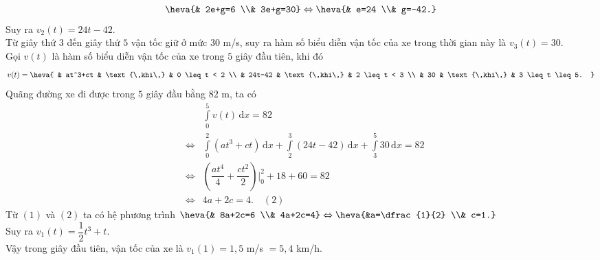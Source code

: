\begin{bt}
{	$$ \heva{& 2e+g=6 \\& 3e+g=30} \Leftrightarrow \heva{& e=24 \\& g=-42.} $$
	Suy ra $v_{2}(t)=24t-42$.\\
	Từ giây thứ $3$ đến giây thứ $5$ vận tốc giữ ở mức $30$ m/s, suy ra hàm số biểu diễn vận tốc của xe trong thời gian này là $v_{3}(t)=30$.\\
	Gọi $v(t)$ là hàm số biểu diễn vận tốc của xe trong $5$ giây đầu tiên, khi đó
	$$ v(t)=\heva{
	& at^3+ct & \text{\,khi\,} & 0 \leq t < 2 \\
	& 24t-42 & \text{\,khi\,} & 2 \leq t < 3 \\
	& 30 & \text{\,khi\,} & 3 \leq t \leq 5.
	} $$
	Quãng đường xe đi được trong $5$ giây đầu bằng $82$ m, ta có
	\begin{eqnarray*}
		&& \displaystyle\int\limits_0^5 v(t) \mathrm{\,d}x= 82 \\
		&\Leftrightarrow& \displaystyle\int\limits_0^2 (at^3+ct) \mathrm{\,d}x + \displaystyle\int\limits_2^3 (24t-42) \mathrm{\,d}x + \displaystyle\int\limits_3^5 30 \mathrm{\,d}x = 82 \\
		&\Leftrightarrow& \left(\dfrac{at^4}{4}+\dfrac{ct^2}{2}\right)\Bigg|_0^2 + 18 + 60 = 82 \\
		&\Leftrightarrow& 4a+2c=4. \quad(2)
	\end{eqnarray*}
	Từ $(1)$ và $(2)$ ta có hệ phương trình $\heva{& 8a+2c=6 \\& 4a+2c=4} \Leftrightarrow \heva{&a=\dfrac{1}{2} \\& c=1.}$\\
	Suy ra $v_{1}(t)=\dfrac{1}{2}t^3+t$.\\
	Vậy trong giây đầu tiên, vận tốc của xe là $v_{1}(1)=1{,}5$ m/s $=5{,}4$ km/h.
	}
\end{bt}

%

